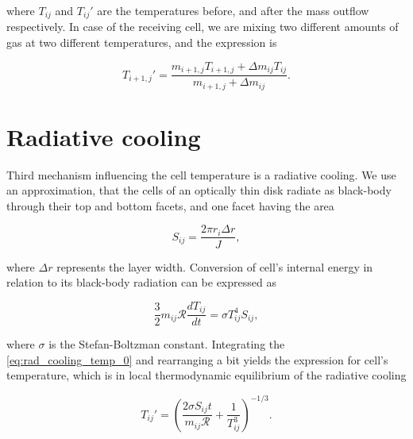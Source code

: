 where $T_{ij}$ and $T_{ij}'$ are the temperatures before, and after the mass outflow respectively. In case of the receiving cell, we are mixing two different amounts of gas at two different temperatures, and the expression is

\begin{equation}
T_{i+1,j}' = \frac{m_{i+1,j} T_{i+1,j} + \Delta m_{ij} T_{ij}}{m_{i+1,j} + \Delta m_{ij}}.
\end{equation}

\section{Radiative cooling}

Third mechanism influencing the cell temperature is a radiative cooling. We use an approximation, that the cells of an optically thin disk radiate as black-body through their top and bottom facets, and one facet having the area

\begin{equation}
	S_{ij} = \frac{2 \pi r_i \Delta r}{J},
	\label{eq:facet_area}
\end{equation}

where $\Delta r$ represents the layer width. Conversion of cell's internal energy in relation to its black-body radiation can be expressed as

\begin{equation}
	\frac{3}{2} m_{ij} \mathcal{R} \frac{dT_{ij}}{dt} = \sigma T_{ij}^4 S_{ij},
	\label{eq:rad_cooling_temp_0}
\end{equation}

where $\sigma$ is the Stefan-Boltzman constant. Integrating the \eqref{eq:rad_cooling_temp_0} and rearranging a bit yields the expression for cell's temperature, which is in local thermodynamic equilibrium of the radiative cooling

\begin{equation}
T_{ij}' = \left( \frac{2 \sigma S_{ij} t}{m_{ij} \mathcal{R}} + \frac{1}{T_{ij}^3} \right)^{-1/3}.
\end{equation}

